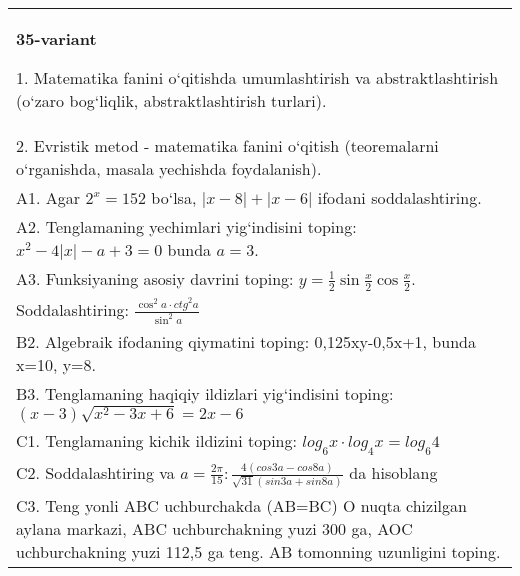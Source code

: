 \documentclass{article}
\begin{document}
\begin{tabular}{m{17cm}}
\textbf{35-variant}

1. Matematika fanini o‘qitishda umumlashtirish va abstraktlashtirish (o‘zaro bog‘liqlik, abstraktlashtirish turlari). \\
2. Evristik metod - matematika fanini o‘qitish (teoremalarni o‘rganishda, masala yechishda foydalanish). \\
A1. Agar \(2^{x} = 152\) bo‘lsa, \(|x - 8| + |x - 6|\) ifodani soddalashtiring. \\
A2. Tenglamaning yechimlari yig‘indisini toping: \(x^2 - 4|x| - a + 3 = 0\) bunda \(a = 3\). \\
A3. Funksiyaning asosiy davrini toping: \(y = \frac{1}{2}\sin{\frac{x}{2}\cos\frac{x}{2}}\). \\
Soddalashtiring: \(\frac{\cos^{2}a \cdot {ctg}^{2}a}{\sin^{2}a}\) \\
B2. Algebraik ifodaning qiymatini toping: 0,125xy-0,5x+1, bunda x=10, y=8. \\
B3. Tenglamaning haqiqiy ildizlari yig‘indisini toping: \((x-3) \sqrt{x^{2} - 3x + 6} = 2x - 6\) \\
C1. Tenglamaning kichik ildizini toping: \(log_{6}x \cdot log_{4}x = log_{6}4\) \\
C2. Soddalashtiring va \(a = \frac{2\pi}{15}:\frac{4 (cos3a - cos8a) }{\sqrt{31} (sin3a + sin8a) }\) da hisoblang \\
C3. Teng yonli ABC uchburchakda (AB=BC) O nuqta chizilgan aylana markazi, ABC uchburchakning yuzi 300 ga, AOC uchburchakning yuzi 112,5 ga teng. AB tomonning uzunligini toping. \\

\end{tabular}
\vspace{1cm}
\end{document}
